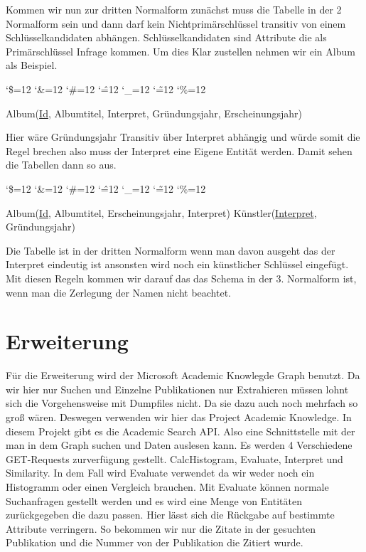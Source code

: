 \documentclass[a4paper,12pt]{article}
\newenvironment{simplechar}{%
	\catcode`\$=12
	\catcode`\&=12
	\catcode`\#=12
	\catcode`\^=12
	\catcode`\_=12
	\catcode`\~=12
	\catcode`\%=12
}{}
\begin{document}
	Kommen wir nun zur dritten Normalform zunächst muss die Tabelle in der 2 Normalform sein und dann darf kein Nichtprimärschlüssel transitiv von einem Schlüsselkandidaten abhängen. Schlüsselkandidaten sind Attribute die als Primärschlüssel Infrage kommen. Um dies Klar zustellen nehmen wir ein Album als Beispiel.
	
	\begin{simplechar}
		\begin{flushleft}
			\begin{small}
				Album(\uline{Id}, Albumtitel, Interpret, Gründungsjahr, Erscheinungsjahr)
			\end{small}
		\end{flushleft}
	\end{simplechar}

	Hier wäre Gründungsjahr Transitiv über Interpret abhängig und würde somit die Regel brechen also muss der Interpret eine Eigene Entität werden. Damit sehen die Tabellen dann so aus.
	
	\begin{simplechar}
		\begin{flushleft}
			\begin{small}
				Album(\uline{Id}, Albumtitel, Erscheinungsjahr, Interpret)
				Künstler(\uline{Interpret}, Gründungsjahr)
			\end{small}
		\end{flushleft}
	\end{simplechar}
	
	Die Tabelle ist in der dritten Normalform wenn man davon ausgeht das der Interpret eindeutig ist ansonsten wird noch ein künstlicher Schlüssel eingefügt. Mit diesen Regeln kommen wir darauf das das Schema in der 3. Normalform ist, wenn man die Zerlegung der Namen nicht beachtet.
	
	
	\section{Erweiterung}
	Für die Erweiterung wird der Microsoft Academic Knowlegde Graph benutzt. Da wir hier nur Suchen und Einzelne Publikationen nur Extrahieren müssen lohnt sich die Vorgehensweise mit Dumpfiles nicht. Da sie dazu auch noch mehrfach so groß wären. Deswegen verwenden wir hier das Project Academic Knowledge. In diesem Projekt gibt es die Academic Search API. Also eine Schnittstelle mit der man in dem Graph suchen und Daten auslesen kann. Es werden 4 Verschiedene GET-Requests zurverfügung gestellt. CalcHistogram, Evaluate, Interpret und Similarity. In dem Fall wird Evaluate verwendet da wir weder noch ein Histogramm oder einen Vergleich brauchen. Mit Evaluate können normale Suchanfragen gestellt werden und es wird eine Menge von Entitäten zurückgegeben die dazu passen. Hier lässt sich die Rückgabe auf bestimmte Attribute verringern. So bekommen wir nur die Zitate in der gesuchten Publikation und die Nummer von der Publikation die Zitiert wurde.
	
\end{document}
